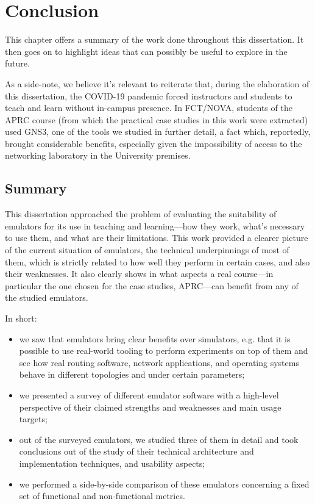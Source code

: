 
\chapter{Conclusion}
\label{ch:conclusion}

This chapter offers a summary of the work done throughout this dissertation.
It then goes on to highlight ideas that can possibly be useful to explore in the future.

As a side-note, we believe it's relevant to reiterate that, during the elaboration of this dissertation, the COVID-19 pandemic forced instructors and students to teach and learn without in-campus presence.
In FCT/NOVA, students of the APRC course (from which the practical case studies in this work were extracted) used GNS3, one of the tools we studied in further detail, a fact which, reportedly, brought considerable benefits, especially given the impossibility of access to the networking laboratory in the University premises.

\section{Summary}

This dissertation approached the problem of evaluating the suitability of emulators for its use in teaching and learning---how they work, what's necessary to use them, and what are their limitations.
This work provided a clearer picture of the current situation of emulators, the technical underpinnings of most of them, which is strictly related to how well they perform in certain cases, and also their weaknesses.
It also clearly shows in what aspects a real course---in particular the one chosen for the case studies, APRC---can benefit from any of the studied emulators.

In short:
\begin{itemize}
  \item we saw that emulators bring clear benefits over simulators, e.g. that it is possible to use real-world tooling to perform experiments on top of them and see how real routing software, network applications, and operating systems behave in different topologies and under certain parameters;
  \item we presented a survey of different emulator software with a high-level perspective of their claimed strengths and weaknesses and main usage targets;
  \item out of the surveyed emulators, we studied three of them in detail and took conclusions out of the study of their technical architecture and implementation techniques, and usability aspects;
  \item we performed a side-by-side comparison of these emulators concerning a fixed set of functional and non-functional metrics.
\end{itemize}

